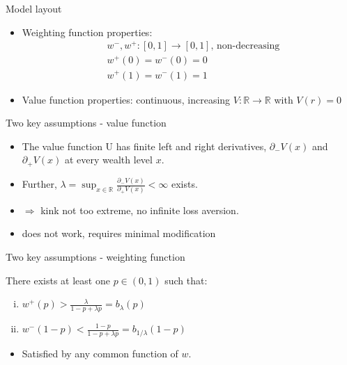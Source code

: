 \begin{frame}{Model layout}
    \begin{itemize}
    \item Weighting function properties:
    \begin{align*}
        &w^-,w^+:[0,1] \rightarrow [0,1],\, \text{non-decreasing}\\
        &w^+(0) = w^-(0) = 0\\
        &w^+(1) = w^-(1) = 1
    \end{align*}
    \item Value function properties: continuous, increasing $V:\mathbb{R} \rightarrow \mathbb{R}$ with $V(r) = 0$\medskip
\end{itemize}
\end{frame}

\begin{frame}{Two key assumptions - value function}
    \begin{assumption}[1]
    \begin{itemize}
        \item The value function U has finite left and right derivatives,
       $\partial _-V(x)$ and $\partial _+V(x)$ at every wealth level $x$.\medskip
        \item Further, $\lambda = \sup _{x\in \mathbb{R} } \frac{\partial _-V(x)}{\partial _+V(x)} < \infty$ exists.\medskip
        \item $\Rightarrow$ kink not too extreme, no infinite loss aversion.\medskip
        \item \citet{KahnemanTversky1979} does not work, requires minimal modification\medskip
    \end{itemize}
\end{assumption}
\end{frame}

\begin{frame}{Two key assumptions - weighting function}
\begin{assumption}[2]
    There exists at least one $p \in (0,1)$ such that:\medskip
    \begin{enumerate}[(i)]
        \item $w^+(p)> \frac{\lambda}{1-p+\lambda p} = b_{\lambda}(p)$ \medskip
        \item $w^-(1-p)< \frac{1-p}{1-p+\lambda p} = b_{1/\lambda}(1-p)$  \medskip
	\end{enumerate}
\end{assumption}
\begin{itemize}
\item     Satisfied by any common function of $w$.
\end{itemize}
\end{frame}


